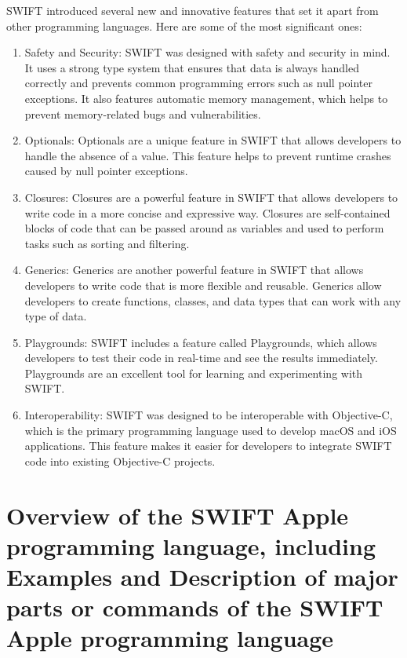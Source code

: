 \documentclass[11pt]{Abdullahmad} %
\begin{document}
SWIFT introduced several new and innovative features that set it apart from other programming languages. Here are some of the most significant ones: \cite{singh2017raising}
\begin{enumerate}
	\item Safety and Security: SWIFT was designed with safety and security in mind. It uses a strong 
      type system that ensures that data is always handled correctly and prevents common
      programming errors such as null pointer exceptions. It also features automatic memory 
      management, which helps to prevent memory-related bugs and vulnerabilities.
	\item Optionals: Optionals are a unique feature in SWIFT that allows developers to handle the
      absence of a value. This feature helps to prevent runtime crashes caused by null pointer
      exceptions.
        \item Closures: Closures are a powerful feature in SWIFT that allows developers to write code in a
      more concise and expressive way. Closures are self-contained blocks of code that can be 
      passed around as variables and used to perform tasks such as sorting and filtering.
	\item Generics: Generics are another powerful feature in SWIFT that allows developers to write code 
    that is more flexible and reusable. Generics allow developers to create functions, classes,
    and data types that can work with any type of data.
	\item Playgrounds: SWIFT includes a feature called Playgrounds, which allows developers to test their 
   code in real-time and see the results immediately. Playgrounds are an excellent tool for learning
   and experimenting with SWIFT.
	\item Interoperability: SWIFT was designed to be interoperable with Objective-C,  which is the primary
   programming language used to develop macOS and iOS applications. This feature makes it easier
   for developers to integrate SWIFT code into existing Objective-C projects. \cite{garcia2015swift}
\end{enumerate}


\newpage
\section*{Overview of the SWIFT Apple programming language, including Examples
 and Description of major parts or commands of the SWIFT Apple 
programming language}
\end{document}
